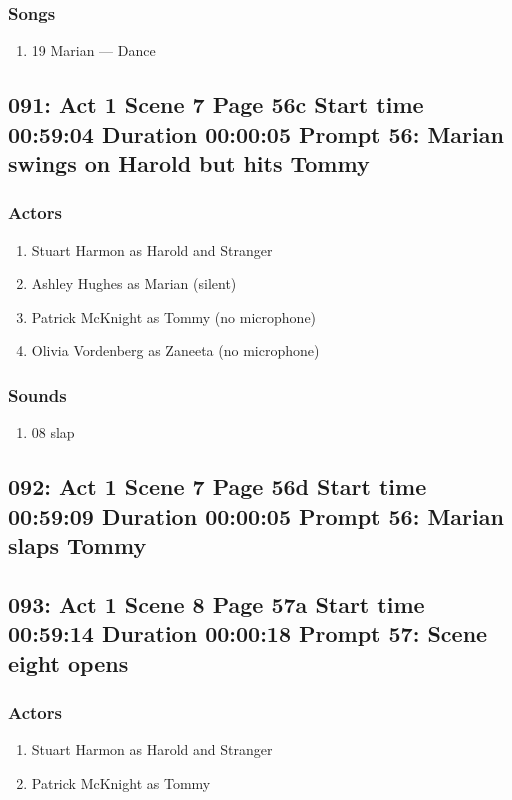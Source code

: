 \subsubsection{Songs}
\begin{enumerate}
\item 19 Marian --- Dance
\end{enumerate}
\subsection{091: Act 1 Scene 7 Page 56c Start time 00:59:04 Duration 00:00:05 Prompt 56: Marian swings on Harold but hits Tommy}

\subsubsection{Actors}
\begin{enumerate}
\item Stuart Harmon as Harold and Stranger
\item Ashley Hughes as Marian (silent)
\item Patrick McKnight as Tommy (no microphone)
\item Olivia Vordenberg as Zaneeta (no microphone)
\end{enumerate}

\subsubsection{Sounds}
\begin{enumerate}
\item 08 slap
\end{enumerate}
\subsection{092: Act 1 Scene 7 Page 56d Start time 00:59:09 Duration 00:00:05 Prompt 56: Marian slaps Tommy}

\subsection{093: Act 1 Scene 8 Page 57a Start time 00:59:14 Duration 00:00:18 Prompt 57: Scene eight opens}

\subsubsection{Actors}
\begin{enumerate}
\item Stuart Harmon as Harold and Stranger
\item Patrick McKnight as Tommy
\end{enumerate}

